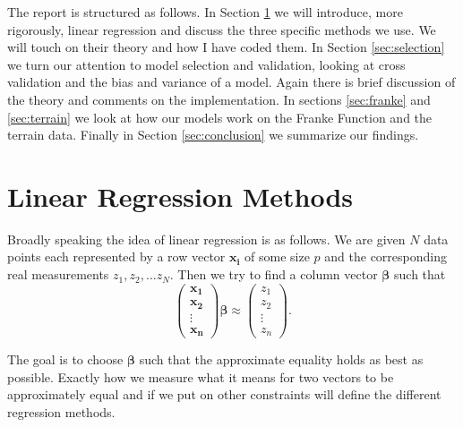 \documentclass[parskip=half]{scrartcl}
\theoremstyle{definition}
\theoremstyle{remark}
\newcommand{\vect}[1]{{\bm{#1}}}
\begin{document}
The report is structured as follows. 
In Section \ref{sec:lrm} we will introduce, more rigorously, linear regression and discuss the three specific methods we use. 
We will touch on their theory and how I have coded them.
In Section \ref{sec:selection} we turn our attention to model selection and validation, looking at cross validation and the bias and variance of a model. 
Again there is brief discussion of the theory and comments on the implementation. 
In sections \ref{sec:franke} and \ref{sec:terrain} we look at how our models work on the Franke Function and the terrain data. 
Finally in Section \ref{sec:conclusion} we summarize our findings. 

\section{Linear Regression Methods} \label{sec:lrm}
 
Broadly speaking the idea of linear regression is as follows.
We are given $N$ data points each represented by a row vector $\vect{x_i}$ of some size $p$ and the corresponding real measurements $z_1, z_2, \ldots z_N$. 
Then we try to find a column vector $\vect{\beta}$ such that 
\[
	\begin{pmatrix}
		\vect{x_1} \\
		\vect{x_2} \\
		\vdots \\
		\vect{x_n}
	\end{pmatrix} \vect{\beta}
	\approx
	\begin{pmatrix} z_1 \\ z_2 \\ \vdots \\ z_n \end{pmatrix}.	
\]

The goal is to choose $\vect{\beta}$ such that the approximate equality holds as best as possible. 
Exactly how we measure what it means for two vectors to be approximately equal and if we put on other constraints will define the different regression methods. 
\end{document}
